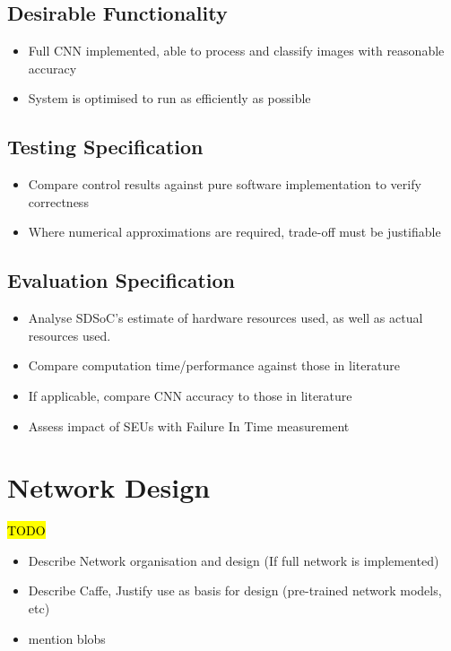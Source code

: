 \documentclass[12pt]{article}
\begin{document}
\subsection{Desirable Functionality}
\label{sec:ProjSpec-Desirable}


\begin{itemize}
\item Full CNN implemented, able to process and classify images with reasonable accuracy
\item System is optimised to run as efficiently as possible
\end{itemize}

\subsection{Testing Specification}
\label{sec:ProjSpec-TestSpec}


\begin{itemize}
\item Compare control results against pure software implementation to verify correctness
\item Where numerical approximations are required, trade-off must be justifiable
\end{itemize}

\subsection{Evaluation Specification}
\label{sec:ProjSpec-EvalSpec}


\begin{itemize}
\item Analyse SDSoC's estimate of hardware resources used, as well as actual resources used.
\item Compare computation time/performance against those in literature
\item If applicable, compare CNN accuracy to those in literature
\item Assess impact of SEUs with Failure In Time measurement
\end{itemize}

\newpage

\section{Network Design}
\label{sec:Design-Network}

\hl{TODO}

\begin{itemize}
\item Describe Network organisation and design (If full network is implemented)
\item Describe Caffe, Justify use as basis for design (pre-trained network models, etc)
\item mention blobs
\end{itemize}
\end{document}
